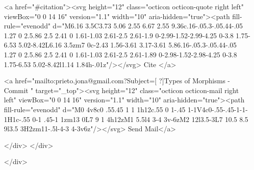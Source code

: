       <a  href="#citation"><svg height="12" class="octicon octicon-quote right left" viewBox="0 0 14 16" version="1.1" width="10" aria-hidden="true"><path fill-rule="evenodd" d="M6.16 3.5C3.73 5.06 2.55 6.67 2.55 9.36c.16-.05.3-.05.44-.05 1.27 0 2.5.86 2.5 2.41 0 1.61-1.03 2.61-2.5 2.61-1.9 0-2.99-1.52-2.99-4.25 0-3.8 1.75-6.53 5.02-8.42L6.16 3.5zm7 0c-2.43 1.56-3.61 3.17-3.61 5.86.16-.05.3-.05.44-.05 1.27 0 2.5.86 2.5 2.41 0 1.61-1.03 2.61-2.5 2.61-1.89 0-2.98-1.52-2.98-4.25 0-3.8 1.75-6.53 5.02-8.42l1.14 1.84h-.01z"/></svg> Cite
      </a>

      <a href="mailto:prieto.jona@gmail.com?Subject=[ ?]Types of Morphisms - Commit " target="_top"><svg height="12" class="octicon octicon-mail right left" viewBox="0 0 14 16" version="1.1" width="10" aria-hidden="true"><path fill-rule="evenodd" d="M0 4v8c0 .55.45 1 1 1h12c.55 0 1-.45 1-1V4c0-.55-.45-1-1-1H1c-.55 0-1 .45-1 1zm13 0L7 9 1 4h12zM1 5.5l4 3-4 3v-6zM2 12l3.5-3L7 10.5 8.5 9l3.5 3H2zm11-.5l-4-3 4-3v6z"/></svg> Send Mail</a>

    </div>
  </div>

</div>




